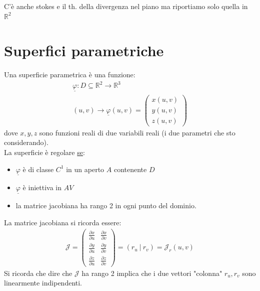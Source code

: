 \documentclass[a4paper, oneside]{article}
\begin{document}
\begin{aside}
    C'è anche stokes e il th. della divergenza nel piano ma riportiamo solo quella in $\mathbb{R}^2$
\end{aside}


\section{Superfici parametriche}
\begin{definition}
  Una superficie parametrica è una funzione:
  \begin{gather*}
    \underline{\varphi} : D \subseteq \mathbb{R}^2 \to \mathbb{R}^3\\
    (u,v) \to \underline{\varphi}(u,v) = \begin{pmatrix}
      x(u,v)\\
      y(u,v)\\
      z(u,v)
    \end{pmatrix}
  \end{gather*}
  dove $x,y,z$ sono funzioni reali di due variabili reali (i due parametri che sto considerando).\\
  La superficie è regolare \underline{se}:
  \begin{itemize}
    \item $\underline{\varphi}$ è di classe $C^1$ in un aperto $A$ contenente $D$
    \item $\underline{\varphi}$ è iniettiva in $AV$
    \item la matrice jacobiana ha rango 2 in ogni punto del dominio.
  \end{itemize} 
  La matrice jacobiana si ricorda essere:
  \begin{gather*}
    \mathcal{J} = \begin{pmatrix}
      \frac{\partial x}{\partial u} & \frac{\partial x}{\partial v}\\
      \frac{\partial y}{\partial u} & \frac{\partial y}{\partial v}\\
      \frac{\partial z}{\partial u} & \frac{\partial z}{\partial v}
    \end{pmatrix} = (r_u \ | \ r_v) = \mathcal{J}_r(u,v)
  \end{gather*}
  Si ricorda che dire che $\mathcal{J}$ ha rango 2 implica che i due vettori "colonna" $r_u, r_v$ sono linearmente indipendenti.
\end{definition}
\end{document}
